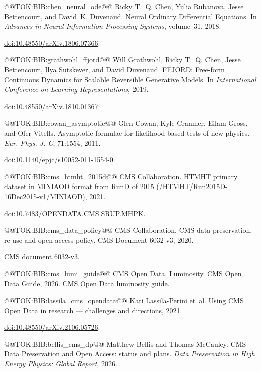 \documentclass{article}
\begin{document}
@@TOK:BIB:chen_neural_ode@@ Ricky T.~Q. Chen, Yulia Rubanova, Jesse Bettencourt, and David~K. Duvenaud.
  {Neural Ordinary Differential Equations}.
  In {\em Advances in Neural Information Processing Systems},
  volume~31, 2018.
 
  \href{https://doi.org/10.48550/arXiv.1806.07366}{doi:10.48550/arXiv.1806.07366}.

@@TOK:BIB:grathwohl_ffjord@@ Will Grathwohl, Ricky T.~Q. Chen, Jesse Bettencourt, Ilya Sutskever, and David
  Duvenaud.
  {FFJORD: Free-form Continuous Dynamics for Scalable Reversible
  Generative Models}.
  In {\em International Conference on Learning Representations}, 2019.
 
  \href{https://doi.org/10.48550/arXiv.1810.01367}{doi:10.48550/arXiv.1810.01367}.

@@TOK:BIB:cowan_asymptotic@@ Glen Cowan, Kyle Cranmer, Eilam Gross, and Ofer Vitells.
  {Asymptotic formulae for likelihood-based tests of new physics}.
  {\em Eur. Phys. J. C}, 71:1554, 2011.
 
  \href{https://doi.org/10.1140/epjc/s10052-011-1554-0}{doi:10.1140/epjc/s10052-011-1554-0}.

@@TOK:BIB:cms_htmht_2015d@@ {CMS Collaboration}.
  {HTMHT primary dataset in MINIAOD format from RunD of 2015
  (/HTMHT/Run2015D-16Dec2015-v1/MINIAOD)}, 2021.
 
  \href{https://doi.org/10.7483/OPENDATA.CMS.SRUP.MHPK}{doi:10.7483/OPENDATA.CMS.SRUP.MHPK}.

@@TOK:BIB:cms_data_policy@@ {CMS Collaboration}.
  {CMS data preservation, re-use and open access policy}.
  CMS Document 6032-v3, 2020.
 
  \href{https://cms-docdb.cern.ch/cgi-bin/PublicDocDB/ShowDocument?docid=6032}{CMS
  document 6032-v3}.

@@TOK:BIB:cms_lumi_guide@@ {CMS Open Data}.
  {Luminosity}.
  CMS Open Data Guide, 2026.
  \href{https://cms-opendata-guide.web.cern.ch/analysis/lumi/}{CMS Open
  Data luminosity guide}.

@@TOK:BIB:lassila_cms_opendata@@ Kati Lassila-Perini et~al.
  {Using CMS Open Data in research --- challenges and directions},
  2021.
 
  \href{https://doi.org/10.48550/arXiv.2106.05726}{doi:10.48550/arXiv.2106.05726}.

@@TOK:BIB:bellis_cms_dp@@ Matthew Bellis and Thomas McCauley.
  {CMS Data Preservation and Open Access: status and plans}.
  {\em Data Preservation in High Energy Physics: Global Report}, 2026.
 
\end{document}
